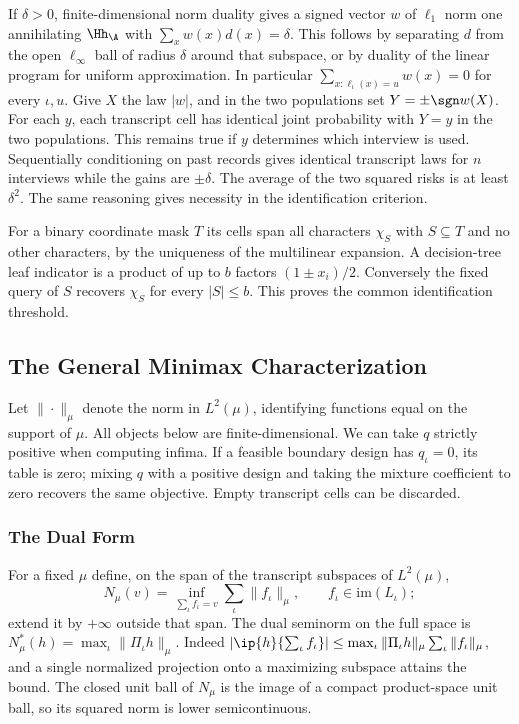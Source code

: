If $\delta>0$, finite-dimensional norm duality gives a signed vector $w$ of $\ell_1$ norm one annihilating $\Hh_\A$ with $\sum_xw(x)d(x)=\delta$. This follows by separating $d$ from the open $\ell_\infty$ ball of radius $\delta$ around that subspace, or by duality of the linear program for uniform approximation. In particular $\sum_{x:\ell_\iota(x)=u} w(x)=0$ for every $\iota,u$. Give $X$ the law $|w|$, and in the two populations set $Y=\pm\sgn w(X)$. For each $y$, each transcript cell has identical joint probability with $Y=y$ in the two populations. This remains true if $y$ determines which interview is used. Sequentially conditioning on past records gives identical transcript laws for $n$ interviews while the gains are $\pm\delta$. The average of the two squared risks is at least $\delta^2$. The same reasoning gives necessity in the identification criterion.

For a binary coordinate mask $T$ its cells span all characters $\chi_S$ with $S\subseteq T$ and no other characters, by the uniqueness of the multilinear expansion. A decision-tree leaf indicator is a product of up to $b$ factors $(1\pm x_i)/2$. Conversely the fixed query of $S$ recovers $\chi_S$ for every $|S|\le b$. This proves the common identification threshold.

\subsection{The General Minimax Characterization}\label{app:general}
Let $\|\cdot\|_\mu$ denote the norm in $L^2(\mu)$, identifying functions equal on the support of $\mu$. All objects below are finite-dimensional. We can take $q$ strictly positive when computing infima. If a feasible boundary design has $q_\iota=0$, its table is zero; mixing $q$ with a positive design and taking the mixture coefficient to zero recovers the same objective. Empty transcript cells can be discarded.

\subsubsection{The Dual Form}
For a fixed $\mu$ define, on the span of the transcript subspaces of $L^2(\mu)$,
\[
 N_\mu(v)=\inf_{\sum_\iota f_\iota=v}\sum_\iota\|f_\iota\|_\mu,\qquad f_\iota\in\mathrm{im}(L_\iota);
\]
extend it by $+\infty$ outside that span. The dual seminorm on the full space is $N_\mu^*(h)=\max_\iota\|\Pi_\iota h\|_\mu$. Indeed $|\ip{h}{\sum_\iota f_\iota}|\le\max_\iota\|\Pi_\iota h\|_\mu\sum_\iota\|f_\iota\|_\mu$, and a single normalized projection onto a maximizing subspace attains the bound. The closed unit ball of $N_\mu$ is the image of a compact product-space unit ball, so its squared norm is lower semicontinuous.

